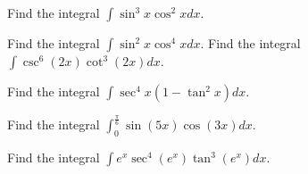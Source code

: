 \documentclass[
  course = {{MATH102 Calculus II}},
  quartile = {{2}},
  assignment = {{Section 7.2}},%
  topic = {{Trigonometric Integrals}},
  firstexercise = 1,
  term = 203
]{../class/aga-homework}
\begin{document}
\fbox{
\begin{minipage}{\textwidth}



\[
\displaystyle
\sin^2 x + \cos^2 x =1, \quad  \tan^2 x + 1 =\sec^2 x,  \quad  1+\cot^2 x  =\csc^2 x,
\]

\[
\displaystyle
\cos^2 x = \frac{1 +\cos 2x }{2}, \quad \sin^2 x = \frac{1 -\cos 2x }{2}
\]

\[
\displaystyle
\begin{array}{ccc}
  \sin A\cos B & = & \frac{1}{2}\left[\sin(A-B)+\sin(A+B)\right], \\[0.2cm]
  \sin A\sin B & = & \frac{1}{2}\left[\cos(A-B)-\cos(A+B)\right], \\[0.2cm]
  \cos A\cos B & = & \frac{1}{2}\left[\cos(A-B)+\cos(A+B)\right], \\
\end{array}
\]


\end{minipage}
}

\newpage

\problem Find the integral $\displaystyle \int \sin^3x\cos^2 x dx $.

\newpage
\problem Find the integral $\displaystyle \int \sin^2 x\cos^4 x dx $.
\newpage
\problem Find the integral $\displaystyle \int \csc^6(2x)\cot^3(2x) dx $.

\newpage
\problem Find the integral $\displaystyle \int \sec^4x\left(1-\tan^2x\right) dx $.

\newpage
\problem Find the integral $\displaystyle \int_0^{\frac{\pi}{6}} \sin(5x)\cos(3x) dx $.


\newpage

 Find the integral $\displaystyle \int e^x\sec^4(e^x)\tan^3(e^x) dx $.
\afterpage{\null\newpage}

\afterpage{\null\newpage}

\afterpage{\null\newpage}
\end{document}
